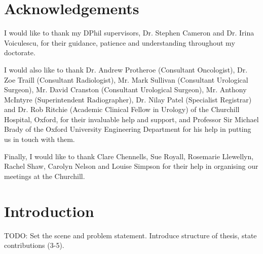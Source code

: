\chapter*{Acknowledgements}

\thispagestyle{empty} %

I would like to thank my DPhil supervisors, Dr. Stephen Cameron and Dr. Irina Voiculescu, for their guidance, patience and understanding throughout my doctorate.

I would also like to thank Dr. Andrew Protheroe (Consultant Oncologist), Dr. Zoe Traill (Consultant Radiologist), Mr. Mark Sullivan (Consultant Urological Surgeon), Mr. David Cranston (Consultant Urological Surgeon), Mr. Anthony McIntyre (Superintendent Radiographer), Dr. Nilay Patel (Specialist Registrar) and Dr. Rob Ritchie (Academic Clinical Fellow in Urology) of the Churchill Hospital, Oxford, for their invaluable help and support, and Professor Sir Michael Brady of the Oxford University Engineering Department for his help in putting us in touch with them.

Finally, I would like to thank Clare Chennells, Sue Royall, Rosemarie Llewellyn, Rachel Shaw, Carolyn Nelson and Louise Simpson for their help in organising our meetings at the Churchill.

\chapter{Introduction}

\setcounter{page}{1} %

TODO: Set the scene and problem statement. Introduce structure of thesis, state contributions (3-5).